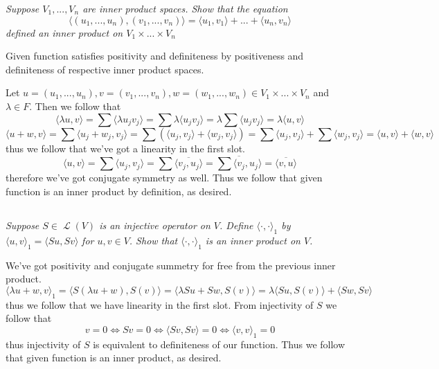 \documentclass[11pt,oneside,titlepage]{book}
\DeclareMathOperator \map {\mathcal {L}}
\newcommand{\eangle}[1]{\langle #1 \rangle}
\begin{document}
\textit{Suppose $V_1, ..., V_n$ are inner product spaces. Show that the equation}
$$\eangle{(u_1, ..., u_n), (v_1, ..., v_n)} = \eangle{u_1, v_1} + ... + \eangle{u_n, v_n}$$
\textit{defined an inner product on $V_1 \times ... \times V_n$}

Given function satisfies positivity and definiteness by positiveness and definiteness
of respective inner product spaces.

Let $u = (u_1, ..., u_n), v = (v_1, ..., v_n), w = (w_1, ..., w_n)
\in V_1 \times ... \times V_n$ and $\lambda \in F$. Then we follow that
$$\eangle{\lambda u, v} = \sum{\eangle{\lambda u_j v_j }} =
\sum{\lambda \eangle{u_j v_j }} = \lambda  \sum{\eangle{u_j v_j }} = \lambda \eangle{u, v}$$
$$\eangle{u + w, v} = \sum {\eangle{u_j + w_j, v_j}} =
\sum {(\eangle{u_j, v_j} + \eangle{w_j, v_j})} =
\sum {\eangle{u_j, v_j}} + \sum {\eangle{w_j, v_j}} = \eangle{u, v} + \eangle{w, v}$$
thus we follow that we've got a linearity in the first slot.
$$\eangle{u, v} = \sum{\eangle{u_j, v_j}} = \sum{\overline{\eangle{v_j, u_j}}} =
\overline{\sum{\eangle{v_j, u_j}}} = \overline{\eangle{v, u}}$$
therefore we've got conjugate symmetry as well. Thus we follow that given function is an
inner product by definition, as desired.

\subsection{}

\textit{Suppose $S \in \map(V)$ is an injective operator on $V$. Define
  $\langle \cdot, \cdot \rangle_1$ by}
$\langle u, v \rangle_1 = \eangle{Su, Sv}$
\textit{for $u, v \in V$. Show that $\langle \cdot, \cdot \rangle_1$ is an inner product on $V$.}

We've got positivity and conjugate summetry for free from the previous inner product.
$$\eangle{\lambda u + w, v}_1 = \eangle{S(\lambda u + w), S(v)} =
\eangle{\lambda S u + Sw, S(v)} = \lambda  \eangle{S u, S(v)} + \eangle{Sw, Sv}$$
thus we follow that we have linearity in the first slot.
From injectivity of $S$ we follow that
$$ v = 0 \iff Sv = 0 \iff \eangle{Sv, Sv} = 0 \iff \eangle{v, v}_1 = 0$$
thus injectivity of $S$ is equivalent to definiteness of our function. Thus we follow that
given function is an inner product, as desired.


\subsection{}
\end{document}
